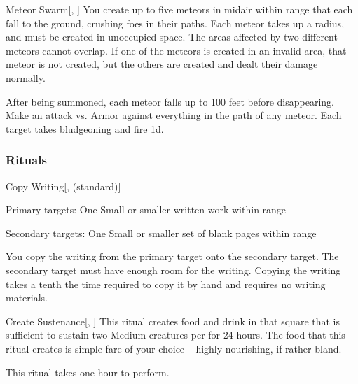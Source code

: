 \lowercase{\hypertarget{spell:Meteor Swarm}{}}\label{spell:Meteor Swarm}
\begin{freeability}[Rank 8]{\hypertarget{spell:Meteor Swarm}{Meteor Swarm}}[, ]
You create up to five meteors in midair within \rnglong range that each fall to the ground, crushing foes in their paths.
Each meteor takes up a \areasmall radius, and must be created in unoccupied space.
The areas affected by two different meteors cannot overlap.
If one of the meteors is created in an invalid area, that meteor is not created, but the others are created and dealt their damage normally.

After being summoned, each meteor falls up to 100 feet before disappearing.
Make an attack vs. Armor against everything in the path of any meteor.
\hit Each target takes bludgeoning and fire  \minus1d.
\end{freeability}
\vspace{0.25em}



\subsubsection{Rituals}


\lowercase{\hypertarget{spell:Copy Writing}{}}\label{spell:Copy Writing}
\begin{freeability}[Rank 1]{\hypertarget{spell:Copy Writing}{Copy Writing}}[,  (standard)]

Primary targets: One Small or smaller written work within \rngclose range
\par\noindent
Secondary targets: One Small or smaller set of blank pages within \rngclose range

You copy the writing from the primary target onto the secondary target.
The secondary target must have enough room for the writing.
Copying the writing takes a tenth the time required to copy it by hand and requires no writing materials.
\end{freeability}
\vspace{0.25em}



\lowercase{\hypertarget{spell:Create Sustenance}{}}\label{spell:Create Sustenance}
\begin{apability}[Rank 3]{\hypertarget{spell:Create Sustenance}{Create Sustenance}}[, ]
This ritual creates food and drink in that square that is sufficient to sustain two Medium creatures per  for 24 hours.
The food that this ritual creates is simple fare of your choice -- highly nourishing, if rather bland.

This ritual takes one hour to perform.
\end{apability}
\vspace{0.25em}



